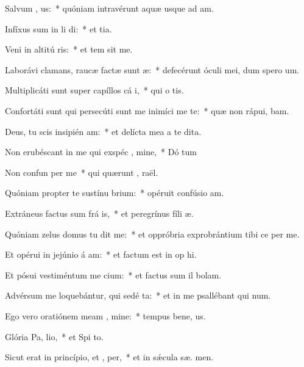 \item Salvum  , us:~* quóniam intravérunt aquæ usque ad  am.
\item Infíxus sum in li di:~* et   tia.
\item Veni in altitú ris:~* et tem sit me.
\item Laborávi clamans, raucæ factæ sunt  æ:~* defecérunt óculi mei, dum spero   um.
\item Multiplicáti sunt super capíllos cá i,~* qui o  tis.
\item Confortáti sunt qui persecúti sunt me inimíci me te:~* quæ non rápui,  bam.
\item Deus, tu scis insipién am:~* et delícta mea a te   dita.
\item Non erubéscant in me qui exspéc , mine,~* Dó tum
\item Non confun per me~* qui quærunt ,  raël.
\item Quóniam propter te sustínu brium:~* opéruit confúsio  am.
\item Extráneus factus sum frá is,~* et peregrínus fíli  æ.
\item Quóniam zelus domus tu dit me:~* et oppróbria exprobrántium tibi ce per me.
\item Et opérui in jejúnio á am:~* et factum est in op hi.
\item Et pósui vestiméntum me cium:~* et factus sum il  bolam.
\item Advérsum me loquebántur, qui sedé  ta:~* et in me psallébant qui  num.
\item Ego vero oratiónem meam  , mine:~* tempus bene, us.
\item Glória Pa,  lio,~* et Spi to.
\item Sicut erat in princípio, et ,  per,~* et in sǽcula sæ. men.
